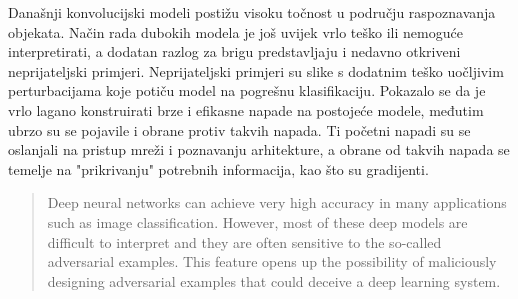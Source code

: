 \documentclass[utf8, diplomski]{fer}
\begin{document}
\begin{sazetak}
Današnji konvolucijski modeli postižu visoku točnost u području raspoznavanja objekata. Način rada dubokih modela je još uvijek vrlo teško ili nemoguće interpretirati, a dodatan razlog za brigu predstavljaju i nedavno otkriveni neprijateljski primjeri. Neprijateljski primjeri su slike s dodatnim teško uočljivim perturbacijama koje potiču model na pogrešnu klasifikaciju. Pokazalo se da je vrlo lagano konstruirati brze i efikasne napade na postojeće modele, međutim  ubrzo su se pojavile i obrane protiv takvih napada. Ti početni napadi su se oslanjali na pristup mreži i poznavanju arhitekture, a obrane od takvih napada se temelje na "prikrivanju" potrebnih informacija, kao što su gradijenti.

\end{sazetak}

\begin{abstract}
Deep neural networks can achieve very high accuracy in many applications such as image classification. However, most of these deep models are difficult to interpret and they are often sensitive to the so-called adversarial examples. This feature opens up the possibility of maliciously designing adversarial examples that could deceive a deep learning system. 

\end{abstract}
\end{document}
